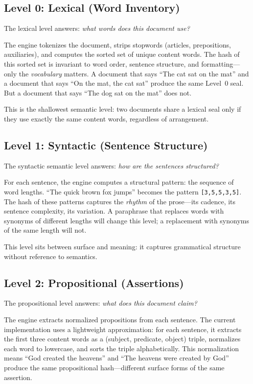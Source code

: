 \documentclass[11pt,a4paper]{article}
\begin{document}
\subsection{Level 0: Lexical (Word Inventory)}

The lexical level answers: \textit{what words does this document use?}

The engine tokenizes the document, strips stopwords (articles, prepositions, auxiliaries), and computes the sorted set of unique content words. The hash of this sorted set is invariant to word order, sentence structure, and formatting---only the \textit{vocabulary} matters. A document that says ``The cat sat on the mat'' and a document that says ``On the mat, the cat sat'' produce the same Level~0 seal. But a document that says ``The dog sat on the mat'' does not.

This is the shallowest semantic level: two documents share a lexical seal only if they use exactly the same content words, regardless of arrangement.

\subsection{Level 1: Syntactic (Sentence Structure)}

The syntactic semantic level answers: \textit{how are the sentences structured?}

For each sentence, the engine computes a structural pattern: the sequence of word lengths. ``The quick brown fox jumps'' becomes the pattern \texttt{[3,5,5,3,5]}. The hash of these patterns captures the \textit{rhythm} of the prose---its cadence, its sentence complexity, its variation. A paraphrase that replaces words with synonyms of different lengths will change this level; a replacement with synonyms of the same length will not.

This level sits between surface and meaning: it captures grammatical structure without reference to semantics.

\subsection{Level 2: Propositional (Assertions)}

The propositional level answers: \textit{what does this document claim?}

The engine extracts normalized propositions from each sentence. The current implementation uses a lightweight approximation: for each sentence, it extracts the first three content words as a (subject, predicate, object) triple, normalizes each word to lowercase, and sorts the triple alphabetically. This normalization means ``God created the heavens'' and ``The heavens were created by God'' produce the same propositional hash---different surface forms of the same assertion.
\end{document}

